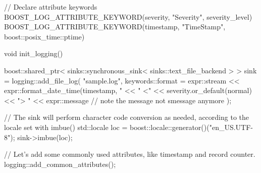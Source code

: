 \documentclass[dvipsnames]{article}
\begin{document}
\begin{simplec}
  // Declare attribute keywords
  BOOST_LOG_ATTRIBUTE_KEYWORD(severity, "Severity", severity_level)
  BOOST_LOG_ATTRIBUTE_KEYWORD(timestamp, "TimeStamp", boost::posix_time::ptime)

  void init_logging(){
    boost::shared_ptr< sinks::synchronous_sink< sinks::text_file_backend > > sink = logging::add_file_log(
    "sample.log",
    keywords::format = expr::stream
    << expr::format_date_time(timestamp, "%
    << " <" << severity.or_default(normal)
    << "> " << expr::message // note the message not smessage anymore
    );

    // The sink will perform character code conversion as needed, according to the locale set with imbue()
    std::locale loc = boost::locale::generator()("en_US.UTF-8");
    sink->imbue(loc);

    // Let's add some commonly used attributes, like timestamp and record counter.
    logging::add_common_attributes();
}
\end{simplec}
\end{document}
